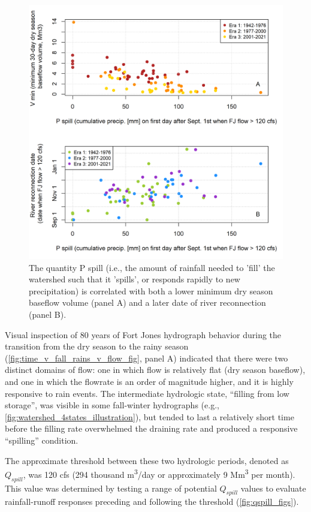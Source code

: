 \documentclass[hess, manuscript]{copernicus}
\begin{document}
\begin{figure}
\includegraphics[width=1\linewidth]{f04} \caption{\label{fig:p_spill_vs_baseflow_and_recon_timing} The quantity P spill (i.e., the amount of rainfall needed to 'fill' the watershed such that it 'spills', or responds rapidly to new precipitation) is correlated with both a lower minimum dry season baseflow volume (panel A) and a later date of river reconnection (panel B).}\label{fig:p_spill_vs_baseflow_and_recon_timing}
\end{figure}

Visual inspection of 80 years of Fort Jones hydrograph behavior during
the transition from the dry season to the rainy season
(\autoref{fig:time_v_fall_rains_v_flow_fig}, panel A) indicated that
there were two distinct domains of flow: one in which flow is relatively
flat (dry season baseflow), and one in which the flowrate is an order of
magnitude higher, and it is highly responsive to rain events. The
intermediate hydrologic state, ``filling from low storage'', was visible
in some fall-winter hydrographs (e.g.,
\autoref{fig:watershed_4states_illustration}), but tended to last a
relatively short time before the filling rate overwhelmed the draining
rate and produced a responsive ``spilling'' condition.

The approximate threshold between these two hydrologic periods, denoted
as \(Q_{spill}\), was 120 cfs (294 thousand m\textsuperscript{3}/day or
approximately 9 Mm\textsuperscript{3} per month). This value was
determined by testing a range of potential \(Q_{spill}\) values to
evaluate rainfall-runoff responses preceding and following the threshold
(\autoref{fig:qspill_figs}).
\end{document}
